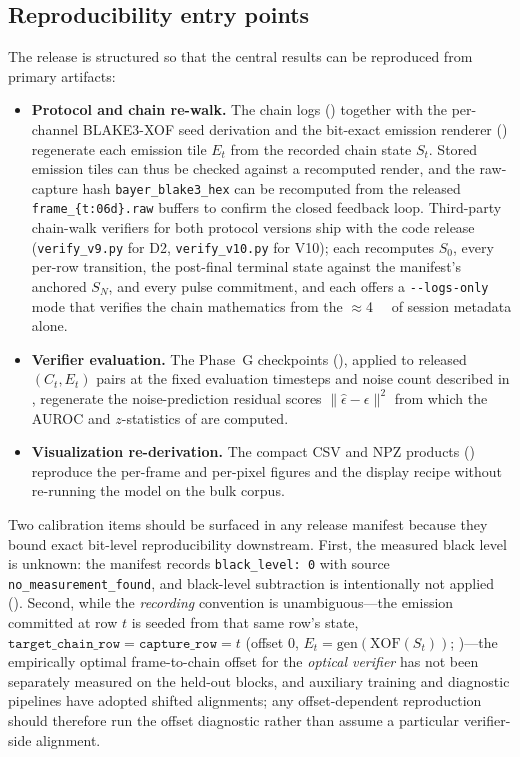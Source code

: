 \subsection{Reproducibility entry points}
\label{sec:availability:repro}

The release is structured so that the central results can be reproduced from primary artifacts:

\begin{itemize}
  \item \textbf{Protocol and chain re-walk.} The chain logs () together with the per-channel BLAKE3-XOF seed derivation \cite{blake3} and the bit-exact emission renderer () regenerate each emission tile $E_t$ from the recorded chain state $S_t$. Stored emission tiles can thus be checked against a recomputed render, and the raw-capture hash \texttt{bayer\_blake3\_hex} can be recomputed from the released \texttt{frame\_\{t:06d\}.raw} buffers to confirm the closed feedback loop. Third-party chain-walk verifiers for both protocol versions ship with the code release (\texttt{verify\_v9.py} for D2, \texttt{verify\_v10.py} for V10); each recomputes $S_0$, every per-row transition, the post-final terminal state against the manifest's anchored $S_N$, and every pulse commitment, and each offers a \texttt{-{}-logs-only} mode that verifies the chain mathematics from the $\approx$\SI{4}{\mega\byte} of session metadata alone.
  \item \textbf{Verifier evaluation.} The Phase~G checkpoints (), applied to released $(C_t, E_t)$ pairs at the fixed evaluation timesteps and noise count described in , regenerate the noise-prediction residual scores $\lVert \hat{\epsilon}-\epsilon\rVert^2$ from which the AUROC and $z$-statistics of  are computed.
  \item \textbf{Visualization re-derivation.} The compact CSV and NPZ products () reproduce the per-frame and per-pixel figures and the display recipe without re-running the model on the bulk corpus.
\end{itemize}

Two calibration items should be surfaced in any release manifest because they bound exact bit-level reproducibility downstream. First, the measured black level is unknown: the manifest records \texttt{black\_level: 0} with source \texttt{no\_measurement\_found}, and black-level subtraction is intentionally not applied (). Second, while the \emph{recording} convention is unambiguous---the emission committed at row $t$ is seeded from that same row's state, $\texttt{target\_chain\_row} = \texttt{capture\_row} = t$ (offset $0$, $E_t = \mathrm{gen}(\mathrm{XOF}(S_t))$; )---the empirically optimal frame-to-chain offset for the \emph{optical verifier} has not been separately measured on the held-out blocks, and auxiliary training and diagnostic pipelines have adopted shifted alignments; any offset-dependent reproduction should therefore run the offset diagnostic rather than assume a particular verifier-side alignment.

